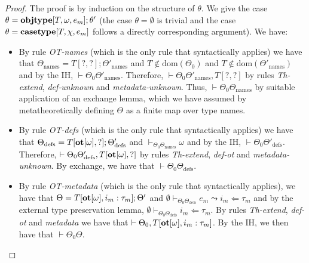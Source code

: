 \begin{proof}
The proof is by induction on the structure of $\theta$. We give the case $\theta = \textbf{objtype}[T, \omega, e_m]; \theta'$ (the case $\theta=\emptyset$ is trivial and the case $\theta=\textbf{casetype}[T, \chi, e_m]$ follows a directly corresponding argument). We have:
\begin{itemize}
\item By rule \textit{OT-names} (which is the only rule that syntactically applies) we have that $\Theta_{\text{names}}=T[?,?];\Theta'_{\text{names}}$ and $T \notin \text{dom}(\Theta_0)$ and $T \notin \text{dom}(\Theta'_{\text{names}})$ and by the IH, $\vdash \Theta_0 \Theta'_{\text{names}}$. Therefore, $\vdash \Theta_0 \Theta'_{\text{names}}, T[?,?]$ by rules \textit{Th-extend}, \textit{def-unknown} and \textit{metadata-unknown}. Thus, $\vdash \Theta_0 \Theta_{\text{names}}$ by suitable application of an exchange lemma, which we have assumed by metatheoretically defining $\Theta$  as a finite map over type names.
\item By rule \textit{OT-defs} (which is the only rule that syntactically applies) we have that $\Theta_{\text{defs}}=T[\textbf{ot}[\omega],?];\Theta'_{\text{defs}}$ and $\vdash_{\Theta_0\Theta_{\text{names}}} \omega$ and by the IH, $\vdash \Theta_0 \Theta'_{\text{defs}}$. Therefore, $\vdash \Theta_0 \Theta'_{\text{defs}}, T[\textbf{ot}[\omega], ?]$ by rules \textit{Th-extend}, \textit{def-ot} and \textit{metadata-unknown}. By exchange, we have that $\vdash \Theta_0 \Theta_{\text{defs}}$. 
\item By rule \textit{OT-metadata} (which is the only rule that syntactically applies), we have that $\Theta = T[\textbf{ot}[\omega], i_m : \tau_m]; \Theta'$ and $\emptyset \vdash_{\Theta_0 \Theta_{\text{defs}}} e_m \leadsto i_m \Leftarrow \tau_m$ and by the external type preservation lemma, $\emptyset \vdash_{\Theta_0 \Theta_{\text{defs}}} i_m \Leftarrow \tau_m$. By rules \textit{Th-extend}, \textit{def-ot} and \textit{metadata}  we have that $\vdash \Theta_0, T[\textbf{ot}[\omega], i_m : \tau_m]$. By the IH, we then have that $\vdash \Theta_0 \Theta$.
\end{itemize}
\end{proof}
